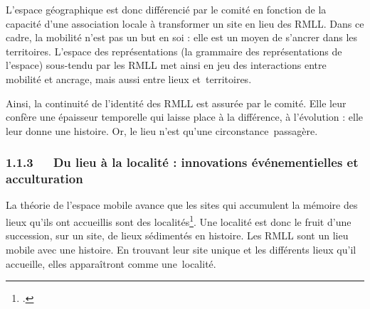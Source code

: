 \documentclass{FramateX}
\begin{document}
\begin{refsection}
L'espace géographique est donc différencié par le comité en fonction de
la capacité d'une association locale à transformer un site en lieu des
RMLL. Dans ce cadre, la mobilité n'est pas un but en soi : elle est un
moyen de s'ancrer dans les territoires. L'espace des représentations
(la grammaire des représentations de l'espace) sous-tendu par les RMLL
met ainsi en jeu des interactions entre mobilité et ancrage, mais aussi
entre lieux et~territoires.

Ainsi, la continuité de l'identité des RMLL est assurée par le comité.
Elle leur confère une épaisseur temporelle qui laisse place à la
différence, à l'évolution : elle leur donne une histoire. Or, le lieu
n'est qu'une circonstance~passagère.

\subsubsection*{1.1.3~~~Du lieu à la localité : innovations événementielles et acculturation}
{}

La théorie de l'espace mobile avance que les sites qui accumulent la
mémoire des lieux qu'ils ont accueillis sont des
localités\footnote{\cite[p.~20]{retailleles2012}.}. Une localité est donc le fruit d'une succession, sur un
site, de lieux sédimentés en histoire. Les RMLL sont un lieu mobile
avec une histoire. En trouvant leur site unique et les différents lieux
qu'il accueille, elles apparaîtront comme une~localité.


\end{refsection}
\end{document}
